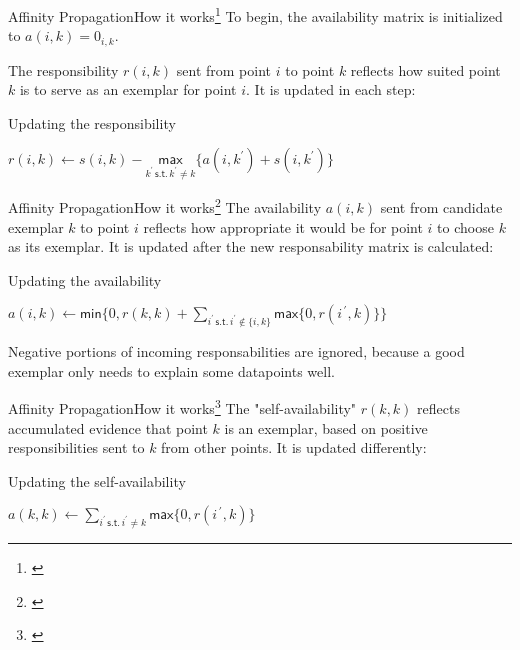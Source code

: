 \documentclass{beamer}
\begin{document}
\begin{frame}{Affinity Propagation}{How it works\footnote{\cite{frey2007clustering}}}
	To begin, the \alert{availability matrix} is initialized to $a(i,k) = 0_{i,k}$.
	
	The \alert{responsibility} $r(i,k)$ sent from point $i$ to point $k$ reflects how suited point $k$ is to serve as an exemplar for point $i$. It is updated in each step:
	
	\begin{block}{Updating the responsibility}
		\begin{center}
			$r(i,k) \leftarrow s(i,k) - \underset{k^\prime\, \mathsf{s.t.}\, k^\prime \neq k}{\mathsf{max}} \{a(i,k^\prime) + s(i,k^\prime)\}$
		\end{center}
	\end{block}
\end{frame}

\begin{frame}{Affinity Propagation}{How it works\footnote{\cite{frey2007clustering}}}
    The \alert{availability} $a(i,k)$ sent from candidate exemplar $k$ to point $i$ reflects how appropriate it would be for point $i$ to choose $k$ as its exemplar. It is updated after the new \alert{responsability matrix} is calculated:
    
    \begin{block}{Updating the availability}
		\begin{center}
			$a(i,k) \leftarrow \mathsf{min}\{0,r(k,k) + \sum\limits_{i^\prime\,\mathsf{s.t.}\, i^\prime \notin \{i,k\}}\mathsf{max}\{0, r(i^{\, \prime} ,k)\}\}$
		\end{center}
    \end{block}
	Negative portions of incoming responsabilities are ignored, because a good exemplar only needs to explain some datapoints well.
\end{frame}

\begin{frame}{Affinity Propagation}{How it works\footnote{\cite{frey2007clustering}}}
    The "self-availability" $r(k,k)$ reflects accumulated evidence that point $k$ is an exemplar, based on positive responsibilities sent to $k$ from other points. It is updated differently:
    
    \begin{block}{Updating the self-availability}
    	\begin{center}
    		$a(k,k) \leftarrow \sum\limits_{i^\prime\, \mathsf{s.t.}\, i^\prime \neq k} \mathsf{max} \{0, r(i^{\, \prime} ,k)\}$
    	\end{center}
    \end{block}
\end{frame}
\end{document}
